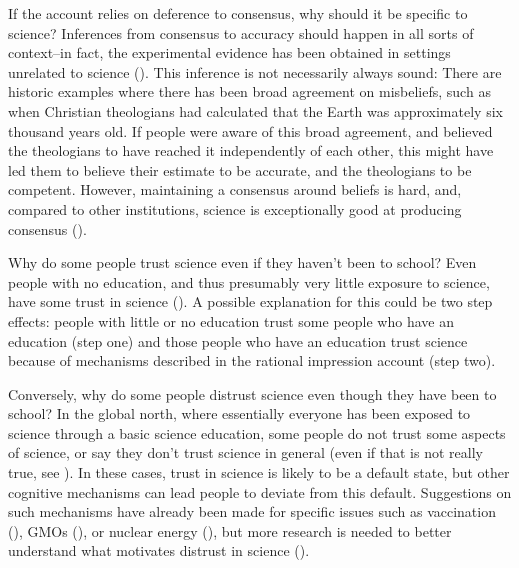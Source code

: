 \documentclass[
  jou,
  floatsintext,
  longtable,
  nolmodern,
  notxfonts,
  notimes,
  colorlinks=true,linkcolor=blue,citecolor=blue,urlcolor=blue]{apa7}
\begin{document}
If the account relies on deference to consensus, why should it be
specific to science? Inferences from consensus to accuracy should happen
in all sorts of context--in fact, the experimental evidence has been
obtained in settings unrelated to science
(). This inference is not necessarily always sound: There are
historic examples where there has been broad agreement on misbeliefs,
such as when Christian theologians had calculated that the Earth was
approximately six thousand years old. If people were aware of this broad
agreement, and believed the theologians to have reached it independently
of each other, this might have led them to believe their estimate to be
accurate, and the theologians to be competent. However, maintaining a
consensus around beliefs is hard, and, compared to other institutions,
science is exceptionally good at producing consensus
().

Why do some people trust science even if they haven't been to school?
Even people with no education, and thus presumably very little exposure
to science, have some trust in science
(). A possible explanation for this could be two
step effects: people with little or no education trust some people who
have an education (step one) and those people who have an education
trust science because of mechanisms described in the rational impression
account (step two).

Conversely, why do some people distrust science even though they have
been to school? In the global north, where essentially everyone has been
exposed to science through a basic science education, some people do not
trust some aspects of science, or say they don't trust science in
general (even if that is not really true, see
). In these cases, trust in science is likely to
be a default state, but other cognitive mechanisms can lead people to
deviate from this default. Suggestions on such mechanisms have already
been made for specific issues such as vaccination
(), GMOs
(), or nuclear energy
(), but more research is needed to better understand what motivates
distrust in science ().
\end{document}
